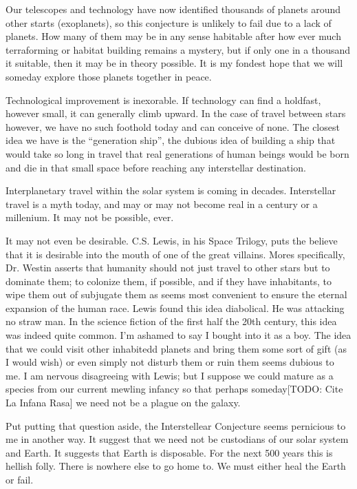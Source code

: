 \documentclass[
	fontsize=10pt, %
	twoside=false, %
	secnumdepth=1, %
]{kaobook}
\begin{document}
Our telescopes and technology have now identified thousands of planets around other starts (exoplanets)\cite{perryman2018exoplanet}, so this
conjecture is unlikely to fail due to a lack of planets. How many of them may
be in any sense habitable after how ever much terraforming or habitat building
remains a mystery, but if only one in a thousand it suitable, then it may
be in theory possible.
It is my fondest hope that we will someday explore those planets together in peace.

Technological improvement is inexorable. If technology can find a holdfast, however small,
it can generally climb upward. In the case of travel between stars however, we have no
such foothold today and can conceive of none. The closest idea we have is the ``generation ship'',
the dubious idea of building a ship that would take so long in travel that real generations of
human beings would be born and die in that small space before reaching any interstellar
destination.

Interplanetary travel within the solar system is coming in decades.
Interstellar travel is a myth today,
and may or may not become real in a century or a millenium. It may not be possible, ever.

It may not even be desirable. C.S. Lewis, in his Space Trilogy\cite{lewis2014space}, puts the believe that
it is desirable into the mouth of one of the great villains.
Mores specifically,
Dr. Westin asserts that humanity should not just travel to other stars but to dominate them;
to colonize them,
if possible, and if they have inhabitants, to wipe them out of subjugate them as seems most convenient
to ensure the eternal expansion of the human race.
Lewis found this idea diabolical.
He was attacking no straw man. In the science fiction of the first half the 20th century, this
idea was indeed quite common. I'm ashamed to say I bought into it as a boy.
The idea that we could visit other inhabitedd planets and bring them some sort of gift (as I would wish)
or even simply not disturb them or ruin them seems dubious to me.
I am nervous disagreeing with Lewis;
but I suppose we could mature as a species from our current mewling infancy so that perhaps someday[TODO: Cite La Infana Rasa]
we need not be a plague on the galaxy.

Put putting that question aside, the Interstellear Conjecture seems pernicious to me in another way.
It suggest that we need not be custodians of our solar system and Earth. It suggests that Earth
is disposable. For the next 500 years this is hellish folly. There is nowhere else to go home to.
We must either heal the Earth or fail.
\end{document}
